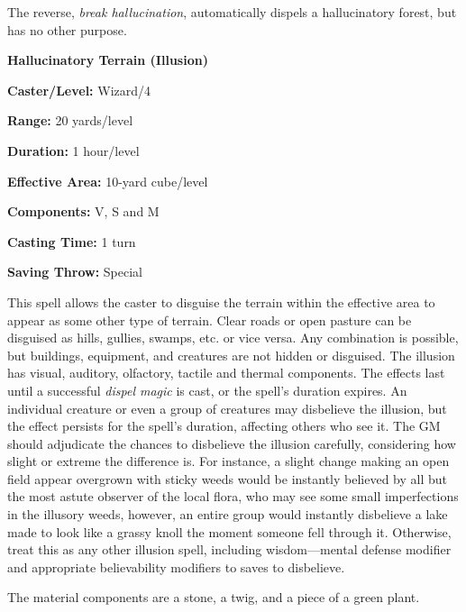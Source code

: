 \begin{multicols}{2}
The reverse, \textit{break hallucination}, automatically dispels a hallucinatory forest, but has no other purpose.

\vspace{1em}

\noindent
\begin{minipage}{\columnwidth}

\noindent \textbf{Hallucinatory Terrain (Illusion)}

\noindent \textbf{Caster/Level:} Wizard/4

\noindent \textbf{Range:} 20 yards/level

\noindent \textbf{Duration:} 1 hour/level

\noindent \textbf{Effective Area:} 10-yard cube/level

\noindent \textbf{Components:} V, S and M

\noindent \textbf{Casting Time:} 1 turn

\noindent \textbf{Saving Throw:} Special

\end{minipage}

This spell allows the caster to disguise the terrain within the effective area to appear as some other type of terrain.  Clear roads or open pasture can be disguised as hills, gullies, swamps, etc. or vice versa.  Any combination is possible, but buildings, equipment, and creatures are not hidden or disguised.  The illusion has visual, auditory, olfactory, tactile and thermal components.  The effects last until a successful \textit{dispel magic} is cast, or the spell's duration expires.  An individual creature or even a group of creatures may disbelieve the illusion, but the effect persists for the spell's duration, affecting others who see it.  The GM should adjudicate the chances to disbelieve the illusion carefully, considering how slight or extreme the difference is.  For instance, a slight change making an open field appear overgrown with sticky weeds would be instantly believed by all but the most astute observer of the local flora, who may see some small imperfections in the illusory weeds, however, an entire group would instantly disbelieve a lake made to look like a grassy knoll the moment someone fell through it.  Otherwise, treat this as any other illusion spell, including wisdom---mental defense modifier and appropriate believability modifiers to saves to disbelieve.

The material components are a stone, a twig, and a piece of a green plant.


\end{multicols}
